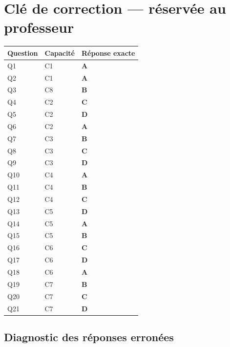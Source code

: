 \ifnxVersionProfesseur
\clearpage
\section*{Clé de correction — réservée au professeur}

\begin{center}
\begin{tabular}{lll}
\hline
Question & Capacité & Réponse exacte \\
\hline
Q1 & C1 & \textbf{A} \\
Q2 & C1 & \textbf{A} \\
Q3 & C8 & \textbf{B} \\
Q4 & C2 & \textbf{C} \\
Q5 & C2 & \textbf{D} \\
Q6 & C2 & \textbf{A} \\
Q7 & C3 & \textbf{B} \\
Q8 & C3 & \textbf{C} \\
Q9 & C3 & \textbf{D} \\
Q10 & C4 & \textbf{A} \\
Q11 & C4 & \textbf{B} \\
Q12 & C4 & \textbf{C} \\
Q13 & C5 & \textbf{D} \\
Q14 & C5 & \textbf{A} \\
Q15 & C5 & \textbf{B} \\
Q16 & C6 & \textbf{C} \\
Q17 & C6 & \textbf{D} \\
Q18 & C6 & \textbf{A} \\
Q19 & C7 & \textbf{B} \\
Q20 & C7 & \textbf{C} \\
Q21 & C7 & \textbf{D} \\
\hline
\end{tabular}
\end{center}

\subsection*{Diagnostic des réponses erronées}

